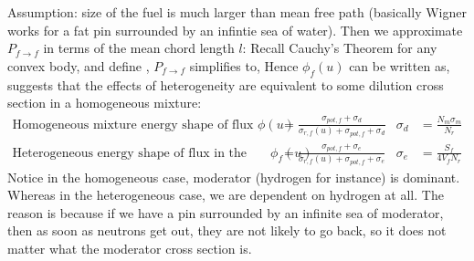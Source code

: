 \documentclass{school-22.211-notes}
\begin{document}
Assumption: size of the fuel is much larger than mean free path (basically Wigner works for a fat pin surrounded by an infintie sea of water). Then we approximate $P_{f\to f}$ in terms of the mean chord length $l$: 
Recall Cauchy's Theorem for any convex body, 
and define ,
$P_{f\to f}$ simplifies to, 
Hence $\phi_f(u)$ can be written as, 
\\
 suggests that the effects of heterogeneity are equivalent to some dilution cross section in a homogeneous mixture:
\begin{align}
\mbox{Homogeneous mixture energy shape of flux } \phi(u) &= \frac{\sigma_{pot, f} + \sigma_d}{\sigma_{r,f} (u) + \sigma_{pot, f} + \sigma_d}   & \sigma_d &= \frac{N_m \sigma_m}{N_r}  \\
\mbox{Heterogeneous energy shape of flux in the fuel } \phi_f(u) &= \frac{\sigma_{pot, f} + \sigma_e}{\sigma_{r,f} (u) + \sigma_{pot, f} + \sigma_e}   & \sigma_e &= \frac{S_f}{4 V_f N_r} 
\end{align}
Notice in the homogeneous case, moderator (hydrogen for instance) is dominant. Whereas in the heterogeneous case, we are dependent on hydrogen at all. The reason is because if we have a pin surrounded by an infinite sea of moderator, then as soon as neutrons get out, they are not likely to go back, so it does not matter what the moderator cross section is. 
\end{document}
